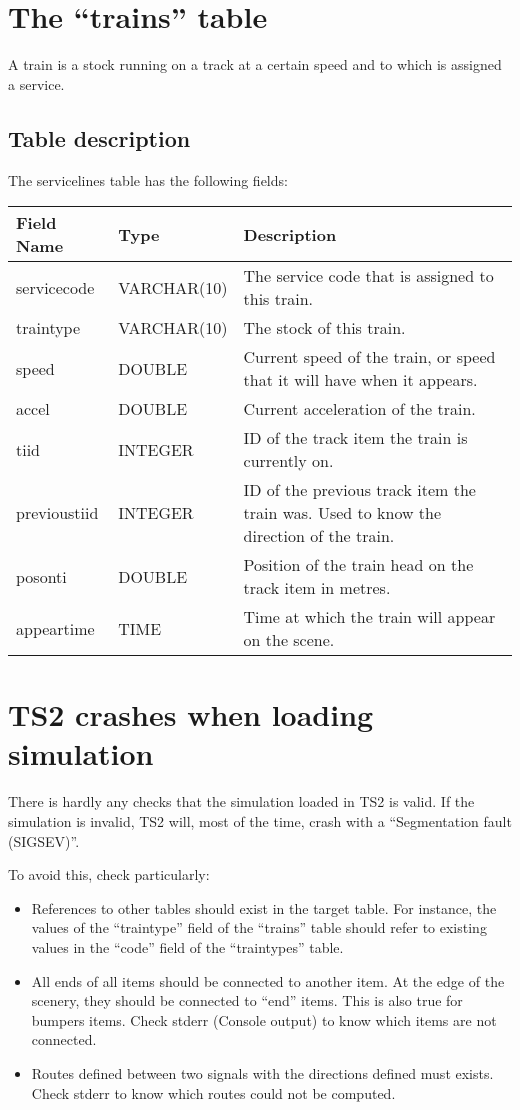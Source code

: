 \documentclass[12pt,a4paper]{article}
\begin{document}
\section{The ``trains'' table}

A train is a stock running on a track at a certain speed and to which is assigned a service.

\subsection{Table description}
The servicelines table has the following fields:
\begin{center}
\begin{tabular}{|l|l|p{10cm}|}
\hline
\textbf{Field Name}&\textbf{Type}&\textbf{Description}\\
\hline
servicecode&VARCHAR(10)&The service code that is assigned to this train.\\
\hline
traintype&VARCHAR(10)&The stock of this train.\\
\hline
speed&DOUBLE&Current speed of the train, or speed that it will have when it appears.\\
\hline
accel&DOUBLE&Current acceleration of the train.\\
\hline
tiid&INTEGER&ID of the track item the train is currently on.\\
\hline
previoustiid&INTEGER&ID of the previous track item the train was. Used to know the direction of the train.\\
\hline
posonti&DOUBLE&Position of the train head on the track item in metres.\\
\hline
appeartime&TIME&Time at which the train will appear on the scene.\\
\hline
\end{tabular}
\end{center}

\section{TS2 crashes when loading simulation}
There is hardly any checks that the simulation loaded in TS2 is valid. If the simulation is invalid, TS2 will, most of the time, crash with a ``Segmentation fault (SIGSEV)''.

To avoid this, check particularly:
\begin{itemize}
 \item References to other tables should exist in the target table. For instance, the values of the ``traintype'' field of the ``trains'' table should refer to existing values in the ``code'' field of the ``traintypes'' table.
 \item All ends of all items should be connected to another item. At the edge of the scenery, they should be connected to ``end'' items. This is also true for bumpers items. Check stderr (Console output) to know which items are not connected.
 \item Routes defined between two signals with the directions defined must exists. Check stderr to know which routes could not be computed.
\end{itemize}
\end{document}

